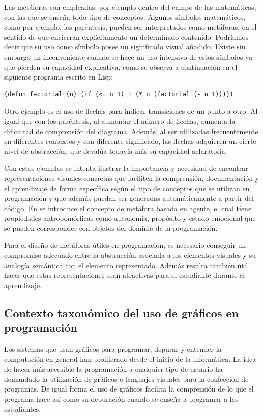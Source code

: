 \documentclass{llncs}
\begin{document}
Las metáforas son empleadas, por ejemplo dentro del campo de las matemáticas, con las que se enseña todo tipo de conceptos. Algunos símbolos matemáticos, como por ejemplo, los paréntesis, pueden ser interpretados como metáforas, en el sentido de que encierran explícitamente un determinado contenido. Podríamos decir que su uso como símbolo posee un significado visual añadido. Existe sin embargo un inconveniente cuando se hace un uso intensivo de estos símbolos ya que pierden su capacidad explicativa, como se observa a continuación en el siguiente programa escrito en Lisp:

\begin{verbatim}
(defun factorial (n) (if (<= n 1) 1 (* n (factorial (- n 1)))))
\end{verbatim}

Otro ejemplo es el uso de flechas para indicar transiciones de un punto a otro. Al igual que con los paréntesis, al aumentar el número de flechas, aumenta la dificultad de comprensión del diagrama. Además, al ser utilizadas frecuentemente en diferentes contextos y con diferente significado, las flechas adquieren un cierto nivel de abstracción, que devalúa todavía más su capacidad aclaratoria. 

Con estos ejemplos se intenta ilustrar la importancia y necesidad de encontrar representaciones visuales concretas que faciliten la comprensión, documentación y el aprendizaje de forma específica según el tipo de conceptos que se utilizan en programación y que además puedan ser generadas automáticamente a partir del código. En \cite{travers1996programming} se introduce el concepto de metáfora basada en agente, el cual tiene propiedades antropomórficas como autonomía, propósito y estado emocional que se pueden corresponder con objetos del dominio de la programación.

Para el diseño de metáforas útiles en programación, es necesario conseguir un compromiso adecuado entre la abstracción asociada a los elementos visuales y su analogía semántica con el elemento representado. Además resulta también útil hacer que estas representaciones sean atractivas para el estudiante durante el aprendizaje. 


\subsection{Contexto taxonómico del uso de gráficos en programación}
\label{subsec:taxonomy}
Los sistemas que usan gráficos para programar, depurar y entender la computación en general han proliferado desde el inicio de la informática. La idea de hacer más accesible la programación a cualquier tipo de usuario ha demandado la utilización de gráficos o lenguajes visuales para la confección de programas. De igual forma el uso de gráficos facilita la comprensión de lo que el programa hace así como su depuración cuando se enseña a programar a los estudiantes. 
\end{document}
